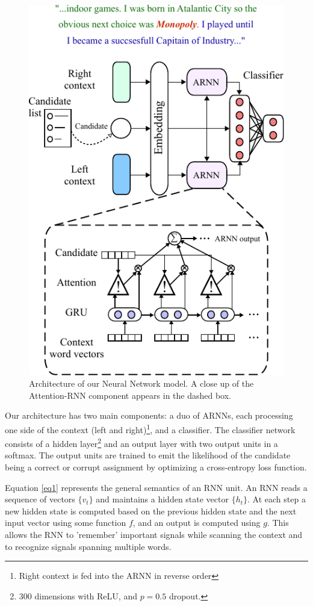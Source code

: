 \documentclass[11pt]{article}
\begin{document}
	\begin{figure}
		\centering
		\includegraphics[scale=1]{diagrams/model_color_v4.pdf}
		\caption{Architecture of our Neural Network model. A close up of the Attention-RNN component appears in the dashed box.}
		\label{fig:arnn}
	\end{figure}	
	
	Our architecture has two main components: a duo of ARNNs, each processing one side of the context (left and right)\footnote{Right context is fed into the ARNN in reverse order}, and a classifier. The classifier network consists of a hidden layer\footnote{300 dimensions with ReLU, and $p=0.5$ dropout.} and an output layer with two output units in a softmax. The output units are trained to emit the likelihood of the candidate being a correct or corrupt assignment by optimizing a cross-entropy loss function. 
	
	Equation \ref{eq1} represents the general semantics of an RNN unit. An RNN reads a sequence of vectors $\{v_t\}$ and maintains a hidden state vector $\{h_t\}$. At each step a new hidden state is computed based on the previous hidden state and the next input vector using some function $f$, and an output is computed using $g$. This allows the RNN to 'remember' important signals while scanning the context and to recognize signals spanning multiple words.
	
\end{document}
